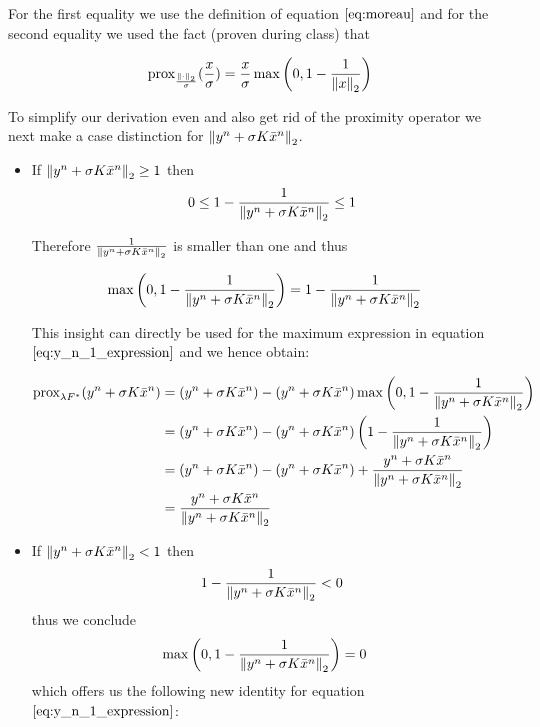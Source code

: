 For the first equality we use the definition of equation $\ref{eq:moreau}$ and for the second equality we used the fact (proven during class) that

\begin{align}
	\text{prox}_{\frac{\left\lVert\cdot\right\rVert_2}{\sigma}}(\frac{x}{\sigma}) = \frac{x}{\sigma} \max{\left(0, 1-\frac{1}{\left\lVert x\right\rVert_2}\right)}
\end{align}

To simplify our derivation even and also get rid of the proximity operator we next make a case distinction for $\left\lVert y^n + \sigma K \bar{x}^{n}\right\rVert_2$. 

\begin{itemize}
	\item If $\left\lVert y^n + \sigma K \bar{x}^{n}\right\rVert_2 \geq 1$
		then  
		\begin{align}
			0 \leq 1-\frac{1}{\left\lVert y^n + \sigma K \bar{x}^{n}\right\rVert_2} \leq 1
		\end{align}
		
		Therefore $\frac{1}{\left\lVert y^n + \sigma K \bar{x}^{n}\right\rVert_2}$ is smaller than one and thus
		
		\begin{align}
			\max{\left(0, 1-\frac{1}{\left\lVert y^n + \sigma K \bar{x}^{n}\right\rVert_2}\right)} 
			&= 1-\frac{1}{\left\lVert y^n + \sigma K \bar{x}^{n}\right\rVert_2}
		\end{align}
		
		This insight can directly be used for the maximum expression in equation $\ref{eq:y_n_1_expression}$ and we hence obtain:
		
		\begin{align}
			\text{prox}_{\lambda F^*}(y^n + \sigma K \bar{x}^{n})
			&= (y^n + \sigma K \bar{x}^{n}) - \left( y^n + \sigma K \bar{x}^{n} \right) \max{\left(0, 1-\frac{1}{\left\lVert y^n + \sigma K \bar{x}^{n} \right\rVert_2}\right)} \nonumber \\
			&= (y^n + \sigma K \bar{x}^{n}) - \left( y^n + \sigma K \bar{x}^{n} \right) \left( 1-\frac{1}{\left\lVert y^n + \sigma K \bar{x}^{n}\right\rVert_2} \right)\nonumber \\
			&= (y^n + \sigma K \bar{x}^{n}) -(y^n + \sigma K \bar{x}^{n}) +\frac{y^n + \sigma K \bar{x}^{n}}{\left\lVert y^n + \sigma K \bar{x}^{n}\right\rVert_2} \nonumber \\
			&= \frac{y^n + \sigma K \bar{x}^{n}}{\left\lVert y^n + \sigma K \bar{x}^{n}\right\rVert_2}
		\end{align}
		
	\item If $\left\lVert y^n + \sigma K \bar{x}^{n}\right\rVert_2 < 1$
		then 
		\begin{align}
			1-\frac{1}{\left\lVert y^n + \sigma K \bar{x}^{n}\right\rVert_2} < 0
		\end{align}
		thus we conclude 
		\begin{align}
			\max{\left(0, 1-\frac{1}{\left\lVert y^n + \sigma K \bar{x}^{n}\right\rVert_2}\right)} 
			&= 0
		\end{align}
		which offers us the following new identity for equation $\ref{eq:y_n_1_expression}$:
		

\end{itemize}

